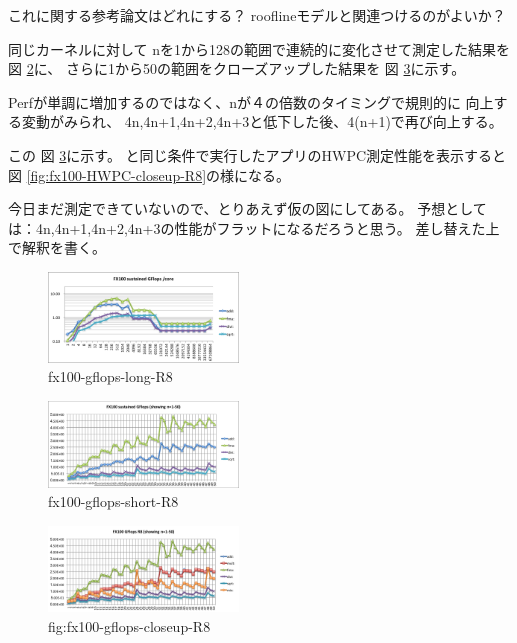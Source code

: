\documentclass[submit,techrep,noauthor]{ipsj}
\begin{document}
{\color{blue} \par
これに関する参考論文はどれにする？
rooflineモデルと関連つけるのがよいか？
} \par

同じカーネルに対して
nを1から128の範囲で連続的に変化させて測定した結果を
図 \ref{fig:fx100-gflops-short-R8}に、
さらに1から50の範囲をクローズアップした結果を
図 \ref{fig:fx100-gflops-closeup-R8}に示す。

Perfが単調に増加するのではなく、nが４の倍数のタイミングで規則的に
向上する変動がみられ、
4n,4n+1,4n+2,4n+3と低下した後、4(n+1)で再び向上する。

この
図 \ref{fig:fx100-gflops-closeup-R8}に示す。
と同じ条件で実行したアプリのHWPC測定性能を表示すると
図 \ref{fig:fx100-HWPC-closeup-R8}の様になる。

{\color{blue} \par
今日まだ測定できていないので、とりあえず仮の図にしてある。
予想としては：4n,4n+1,4n+2,4n+3の性能がフラットになるだろうと思う。
差し替えた上で解釈を書く。

} \par

\begin{figure}[tb]
\centering\includegraphics[width=0.45\textwidth]{figs/fx100-gflops-long-R8}
\caption{fx100-gflops-long-R8}
\label{fig:fx100-gflops-long-R8}
\end{figure}

\begin{figure}[tb]
\centering\includegraphics[width=0.45\textwidth]{figs/fx100-gflops-short-R8}
\caption{fx100-gflops-short-R8}
\label{fig:fx100-gflops-short-R8}
\end{figure}

\begin{figure}[tb]
\centering\includegraphics[width=0.45\textwidth]{figs/fx100-gflops-closeup-R8}
\caption{fig:fx100-gflops-closeup-R8}
\label{fig:fx100-gflops-closeup-R8}
\end{figure}
\end{document}
